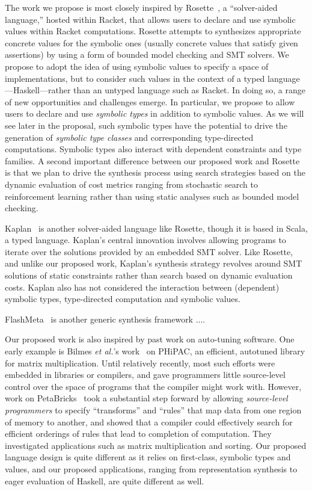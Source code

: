 The work we propose is most closely inspired by
Rosette~\cite{Torlak:rosette-onward,Torlak:rosette-pldi}, a
``solver-aided language,'' hosted within Racket, that allows users to
declare and use symbolic values within Racket computations.  Rosette
attempts to synthesizes appropriate concrete values for the symbolic
ones (usually concrete values that satisfy given assertions) by using
a form of bounded model checking and SMT solvers.  We propose to adopt
the idea of using symbolic values to specify a space of
implementations, but to consider such values in the context of a typed
language---Haskell---rather than an untyped language such as Racket.
In doing so, a range of new opportunities and challenges emerge.  In
particular, we propose to allow users to declare and use
\emph{symbolic types} in addition to symbolic values.  As we will see
later in the proposal, such symbolic types have the potential to drive
the generation of \emph{symbolic type classes} and corresponding
type-directed computations.  Symbolic types also interact with
dependent constraints and type families.  A second important
difference between our proposed work and Rosette is that we plan to
drive the synthesis process 
using search strategies based on the dynamic evaluation of cost metrics
ranging from stochastic search to reinforcement learning rather than using
static analyses such as bounded model checking.

Kaplan~\cite{kaplan} is another solver-aided language like Rosette,
though it is based in Scala, a typed language.  Kaplan's central
innovation involves allowing programs to iterate over the solutions
provided by an embedded SMT solver.  Like Rosette, and unlike our
proposed work, Kaplan's synthesis strategy revolves around SMT solutions
of static constraints rather than search based on dynamic evaluation
costs.  Kaplan also has not considered the interaction between (dependent) 
symbolic types, type-directed computation and symbolic values.

FlashMeta~\cite{Polozov:Flashmeta} is another generic synthesis framework ....

Our proposed work is also inspired by past work on auto-tuning
software.  One early example is Bilmes \emph{et al.}'s 
work~\cite{Bilmes:autotune} on  PHiPAC, an efficient, autotuned library 
for matrix multiplication.  Until relatively recently, most such 
efforts were embedded
in libraries or compilers, and gave programmers little source-level
control over the space of programs that the compiler might work with.
However, work on PetaBricks~\cite{Ansel+:petabricks} took a substantial
step forward by allowing \emph{source-level programmers} to specify 
``transforms'' and ``rules'' that map data from one region of
memory to another, and showed that a compiler could effectively search
for efficient orderings of rules that lead to completion of computation.
They investigated applications such as matrix
multiplication and sorting.  Our proposed language design is quite
different as it relies on first-class, symbolic types and values,
and our proposed applications, ranging from representation synthesis
to eager evaluation of Haskell, are quite different as well.


